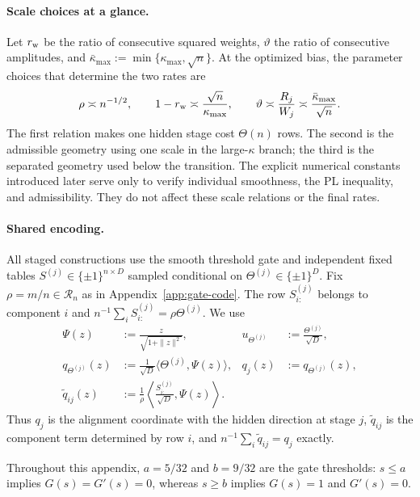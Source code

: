 \documentclass{article}
\theoremstyle{definition}
\begin{document}
\paragraph{Scale choices at a glance.}
Let $r_{\rm w}$ be the ratio of consecutive squared weights,
$\vartheta$ the ratio of consecutive amplitudes, and
$\bar\kappa_{\max}:=\min\{\kappa_{\max},\sqrt n\}$.  At the optimized bias, the
parameter choices that determine the two rates are
\begin{equation*}
\rho\asymp n^{-1/2},\qquad
1-r_{\rm w}\asymp\frac{\sqrt n}{\kappa_{\max}},\qquad
\vartheta\asymp\frac{R_j}{W_j}
\asymp\frac{\bar\kappa_{\max}}{\sqrt n}.
\end{equation*}
The first relation makes one hidden stage cost $\Theta(n)$ rows.  The second is
the admissible geometry using one scale in the large-$\kappa$ branch; the third is the
separated geometry used below the transition.  The explicit numerical constants
introduced later serve only to verify individual smoothness, the PL inequality,
and admissibility.  They do not affect these scale relations or the final rates.

\paragraph{Shared encoding.}
All staged constructions use the smooth threshold gate and independent fixed tables
$S^{(j)}\in\{\pm1\}^{n\times D}$ sampled conditional on
$\Theta^{(j)}\in\{\pm1\}^D$.  Fix $\rho=m/n\in\mathcal R_n$ as in
Appendix~\ref{app:gate-code}.
The row $S^{(j)}_{i:}$ belongs to component $i$ and
$n^{-1}\sum_iS^{(j)}_{i:}=\rho\Theta^{(j)}$.  We use
\begin{equation*}
 \begin{aligned}
  \Psi(z)&:=\frac{z}{\sqrt{1+\|z\|^2}},
  &u_{\Theta^{(j)}}&:=\frac{\Theta^{(j)}}{\sqrt D},
  \\
  q_{\Theta^{(j)}}(z)&:=\frac1{\sqrt D}
     \langle\Theta^{(j)},\Psi(z)\rangle,
  &q_j(z)&:=q_{\Theta^{(j)}}(z),\\
  \widetilde q_{ij}(z)&:=
  \frac1\rho\left\langle\frac{S^{(j)}_{i:}}{\sqrt D},\Psi(z)\right\rangle.
 \end{aligned}
\end{equation*}
Thus $q_j$ is the alignment coordinate with the hidden direction at stage $j$,
$\widetilde q_{ij}$ is the component term determined by row $i$, and
$n^{-1}\sum_i\widetilde q_{ij}=q_j$ exactly.

Throughout this appendix, $a=5/32$ and $b=9/32$ are the gate thresholds:
$s\le a$ implies $G(s)=G'(s)=0$, whereas $s\ge b$ implies
$G(s)=1$ and $G'(s)=0$.
\end{document}
